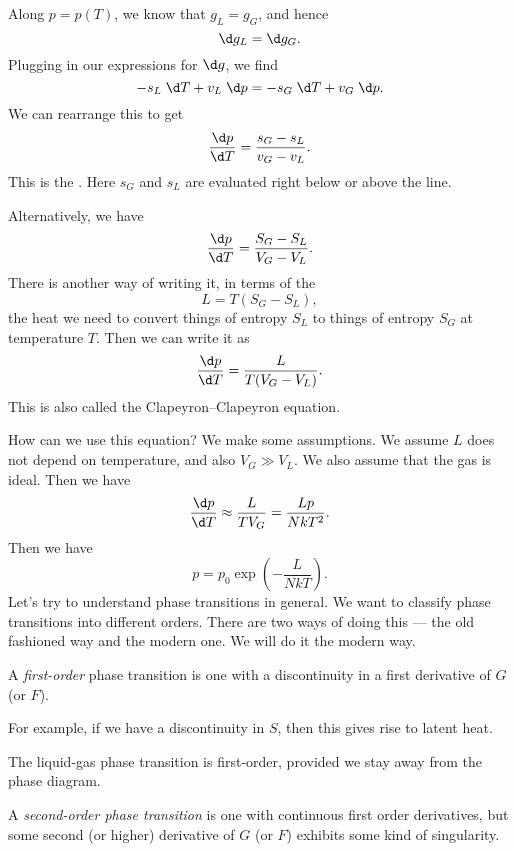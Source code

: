 \documentclass[a4paper]{article}
\begin{document}
Along $p = p(T)$, we know that $g_L = g_G$, and hence
\[
  \d g_L = \d g_G.
\]
Plugging in our expressions for $\d g$, we find
\[
  - s_L \;\d T + v_L \;\d p = - s_G \;\d T + v_G \;\d p.
\]
We can rearrange this to get
\[
  \frac{\d p}{\d T} = \frac{s_G - s_L}{v_G - v_L}.
\]
This is the . Here $s_G$ and $s_L$ are evaluated right below or above the line.

Alternatively, we have
\[
  \frac{\d p}{\d T} = \frac{S_G - S_L}{V_G - V_L}.
\]
There is another way of writing it, in terms of the 
\[
  L = T(S_G - S_L),
\]
the heat we need to convert things of entropy $S_L$ to things of entropy $S_G$ at temperature $T$. Then we can write it as
\[
  \frac{\d p}{\d T} = \frac{L}{T(V_G - V_L)}.
\]
This is also called the Clapeyron--Clapeyron equation.

How can we use this equation? We make some assumptions. We assume $L$ does not depend on temperature, and also $V_G \gg V_L$. We also assume that the gas is ideal. Then we have
\[
  \frac{\d p}{\d T} \approx \frac{L}{T V_G} = \frac{L p}{ NkT^2}.
\]
Then we have
\[
  p = p_0 \exp \left(- \frac{L}{NkT}\right).
\]
Let's try to understand phase transitions in general. We want to classify phase transitions into different orders. There are two ways of doing this --- the old fashioned way and the modern one. We will do it the modern way.

\begin{defi}
  A \emph{first-order} phase transition is one with a discontinuity in a first derivative of $G$ (or $F$).
\end{defi}
For example, if we have a discontinuity in $S$, then this gives rise to latent heat.

\begin{eg}
  The liquid-gas phase transition is first-order, provided we stay away from the phase diagram.
\end{eg}

\begin{defi}
  A \emph{second-order phase transition} is one with continuous first order derivatives, but some second (or higher) derivative of $G$ (or $F$) exhibits some kind of singularity.
\end{defi}
\end{document}
